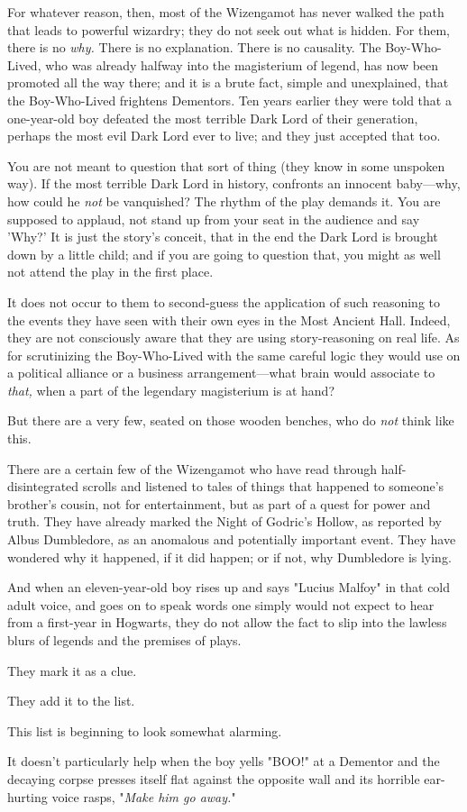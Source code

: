 For whatever reason, then, most of the Wizengamot has never walked the path 
that leads to powerful wizardry; they do not seek out what is hidden. For them, 
there is no \emph{why.} There is no explanation. There is no causality. The 
Boy-Who-Lived, who was already halfway into the magisterium of legend, has now 
been promoted all the way there; and it is a brute fact, simple and 
unexplained, that the Boy-Who-Lived frightens Dementors. Ten years earlier they 
were told that a one-year-old boy defeated the most terrible Dark Lord of their 
generation, perhaps the most evil Dark Lord ever to live; and they just 
accepted that too.

You are not meant to question that sort of thing (they know in some unspoken 
way). If the most terrible Dark Lord in history, confronts an innocent 
baby---why, how could he \emph{not} be vanquished? The rhythm of the play 
demands it. You are supposed to applaud, not stand up from your seat in the 
audience and say 'Why?' It is just the story's conceit, that in the end the 
Dark Lord is brought down by a little child; and if you are going to question 
that, you might as well not attend the play in the first place.

It does not occur to them to second-guess the application of such reasoning to 
the events they have seen with their own eyes in the Most Ancient Hall. Indeed, 
they are not consciously aware that they are using story-reasoning on real 
life. As for scrutinizing the Boy-Who-Lived with the same careful logic they 
would use on a political alliance or a business arrangement---what brain would 
associate to \emph{that,} when a part of the legendary magisterium is at hand?

But there are a very few, seated on those wooden benches, who do \emph{not} 
think like this.

There are a certain few of the Wizengamot who have read through 
half-disintegrated scrolls and listened to tales of things that happened to 
someone's brother's cousin, not for entertainment, but as part of a quest for 
power and truth. They have already marked the Night of Godric's Hollow, as 
reported by Albus Dumbledore, as an anomalous and potentially important event. 
They have wondered why it happened, if it did happen; or if not, why Dumbledore 
is lying.

And when an eleven-year-old boy rises up and says "Lucius Malfoy" in that cold 
adult voice, and goes on to speak words one simply would not expect to hear 
from a first-year in Hogwarts, they do not allow the fact to slip into the 
lawless blurs of legends and the premises of plays.

They mark it as a clue.

They add it to the list.

This list is beginning to look somewhat alarming.

It doesn't particularly help when the boy yells "BOO!" at a Dementor and the 
decaying corpse presses itself flat against the opposite wall and its horrible 
ear-hurting voice rasps, "\emph{Make him go away.}"
